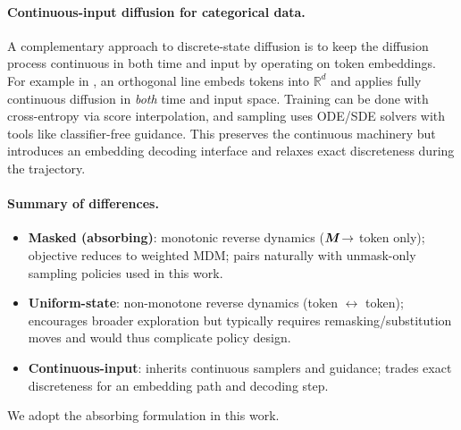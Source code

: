 \paragraph{Continuous-input diffusion for categorical data.}
A complementary approach to discrete-state diffusion is to keep the diffusion process continuous in both time and input by operating on token embeddings. For example in \cite{DBLP:journals/corr/abs-2211-15089}, an orthogonal line embeds tokens into $\mathbb{R}^d$ and applies fully continuous diffusion in \emph{both} time and input space. Training can be done with cross-entropy via score interpolation, and sampling uses ODE/SDE solvers with tools like classifier-free guidance. This preserves the continuous machinery but introduces an embedding decoding interface and relaxes exact discreteness during the trajectory.
\paragraph{Summary of differences.}
\begin{itemize}
\item \textbf{Masked (absorbing)}: monotonic reverse dynamics (${\bm{M}}\!\to$ token only); objective reduces to weighted MDM; pairs naturally with unmask-only sampling policies used in this work.
\item \textbf{Uniform-state}: non-monotone reverse dynamics (token $\!\leftrightarrow$ token); encourages broader exploration but typically requires remasking/substitution moves and would thus complicate policy design.
\item \textbf{Continuous-input}: inherits continuous samplers and guidance; trades exact discreteness for an embedding path and decoding step.
\end{itemize}
We adopt the absorbing formulation in this work.

